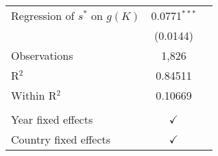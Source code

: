 \centering
\begin{tabularx}{\columnwidth}{lcc}
   Regression of $s^*$ on \(g(K)\)   & 0.0771$^{***}$\\   
                                     & (0.0144)\\   
   Observations                      & 1,826\\  
   R$^2$                             & 0.84511\\  
   Within R$^2$                      & 0.10669\\  
    \\
   Year fixed effects                & $\checkmark$\\   
   Country fixed effects             & $\checkmark$\\   
\end{tabularx}
   \label{tbl-4}
